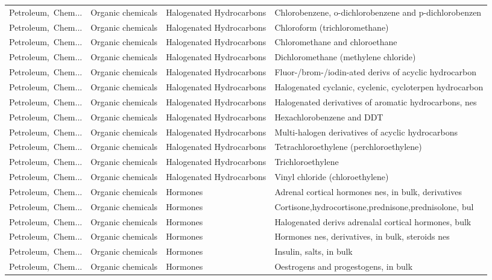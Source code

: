 \begin{appendices}
\begin{xltabular}{\textwidth}{|p{0.10\textwidth}|p{0.25\textwidth}|p{0.24\textwidth}|p{0.31\textwidth}|}
Petroleum,\ Chem... & Organic chemicals & Halogenated Hydrocarbons & Chlorobenzene, o-dichlorobenzene and p-dichlorobenzen \\
Petroleum,\ Chem... & Organic chemicals & Halogenated Hydrocarbons & Chloroform (trichloromethane) \\
Petroleum,\ Chem... & Organic chemicals & Halogenated Hydrocarbons & Chloromethane and chloroethane \\
Petroleum,\ Chem... & Organic chemicals & Halogenated Hydrocarbons & Dichloromethane (methylene chloride) \\
Petroleum,\ Chem... & Organic chemicals & Halogenated Hydrocarbons & Fluor-/brom-/iodin-ated derivs of acyclic hydrocarbon \\
Petroleum,\ Chem... & Organic chemicals & Halogenated Hydrocarbons & Halogenated cyclanic, cyclenic, cycloterpen hydrocarbon \\
Petroleum,\ Chem... & Organic chemicals & Halogenated Hydrocarbons & Halogenated derivatives of aromatic hydrocarbons, nes \\
Petroleum,\ Chem... & Organic chemicals & Halogenated Hydrocarbons & Hexachlorobenzene and DDT \\
Petroleum,\ Chem... & Organic chemicals & Halogenated Hydrocarbons & Multi-halogen derivatives of acyclic hydrocarbons \\
Petroleum,\ Chem... & Organic chemicals & Halogenated Hydrocarbons & Tetrachloroethylene (perchloroethylene) \\
Petroleum,\ Chem... & Organic chemicals & Halogenated Hydrocarbons & Trichloroethylene \\
Petroleum,\ Chem... & Organic chemicals & Halogenated Hydrocarbons & Vinyl chloride (chloroethylene) \\
Petroleum,\ Chem... & Organic chemicals & Hormones & Adrenal cortical hormones nes, in bulk, derivatives \\
Petroleum,\ Chem... & Organic chemicals & Hormones & Cortisone,hydrocortisone,prednisone,prednisolone, bul \\
Petroleum,\ Chem... & Organic chemicals & Hormones & Halogenated derivs adrenalal cortical hormones, bulk \\
Petroleum,\ Chem... & Organic chemicals & Hormones & Hormones nes, derivatives, in bulk, steroids nes \\
Petroleum,\ Chem... & Organic chemicals & Hormones & Insulin, salts, in bulk \\
Petroleum,\ Chem... & Organic chemicals & Hormones & Oestrogens and progestogens, in bulk \\

\end{xltabular}
\end{appendices}
